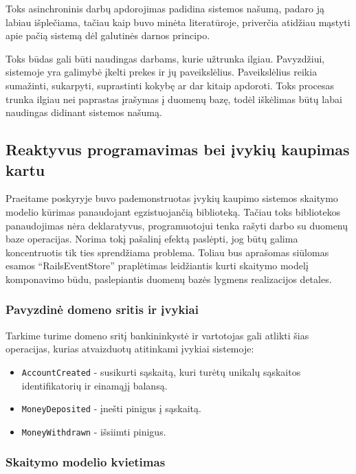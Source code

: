 Toks asinchroninis darbų apdorojimas padidina sistemos našumą, padaro ją labiau išplečiama, tačiau kaip buvo minėta literatūroje, priverčia atidžiau mąstyti apie pačią sistemą dėl galutinės darnos principo.

Toks būdas gali būti naudingas darbams, kurie užtrunka ilgiau. Pavyzdžiui, sistemoje yra galimybė įkelti prekes ir jų paveikslėlius. Paveikslėlius reikia sumažinti, sukarpyti, suprastinti kokybę ar dar kitaip apdoroti. Toks procesas trunka ilgiau nei paprastas įrašymas į duomenų bazę, todėl iškėlimas būtų labai naudingas didinant sistemos našumą.

\subsection{Reaktyvus programavimas bei įvykių kaupimas kartu}

Praeitame poskyryje buvo pademonstruotas įvykių kaupimo sistemos skaitymo modelio kūrimas panaudojant egzistuojančią biblioteką. Tačiau toks bibliotekos panaudojimas nėra deklaratyvus, programuotojui tenka rašyti darbo su duomenų baze operacijas. Norima tokį pašalinį efektą paslėpti, jog būtų galima koncentruotis tik ties sprendžiama problema. Toliau bus aprašomas siūlomas esamos ``RailsEventStore'' praplėtimas leidžiantis kurti skaitymo modelį komponavimo būdu, paslepiantis duomenų bazės lygmens realizacijos detales.

\subsubsection{Pavyzdinė domeno sritis ir įvykiai}

Tarkime turime domeno sritį bankininkystė ir vartotojas gali atlikti šias operacijas, kurias atvaizduotų atitinkami įvykiai sistemoje:

\begin{itemize}
  \item \lstinline|AccountCreated| - susikurti sąskaitą, kuri turėtų unikalų sąskaitos identifikatorių ir einamąjį balansą.
  \item \lstinline|MoneyDeposited| - įnešti pinigus į sąskaitą.
  \item \lstinline|MoneyWithdrawn| - išsiimti pinigus.
\end{itemize}

\subsubsection{Skaitymo modelio kvietimas}

